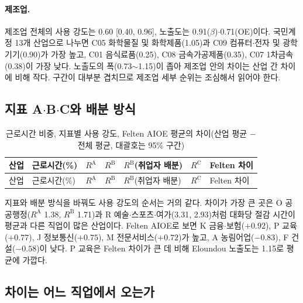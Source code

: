 \documentclass[11pt]{article}
\begin{document}
\paragraph{제조업.} 제조업 전체의 사용 강도는 0.60 [0.40, 0.96], 노출도는 0.91($\beta$)$\cdot$0.71(OE)이다. 국민계정 13개 산업으로 나누면 C05 화학물질 및 화학제품(1.05)과 C09 컴퓨터$\cdot$전자 및 광학기기(0.90)가 가장 높고, C01 음식료품(0.25), C08 금속가공제품(0.35), C07 1차금속(0.38)이 가장 낮다. 노출도의 폭(0.73$\sim$1.15)이 좁아 제조업 안의 차이는 산업 간 차이에 비해 작다. 구간이 대부분 겹치므로 제조업 세부 순위는 조심해서 읽어야 한다.

\subsection{지표 A$\cdot$B$\cdot$C와 배분 방식}

\begin{small}
\begin{longtable}{L{4.6cm}R{1.6cm}R{1.3cm}R{1.3cm}R{2.2cm}R{1.3cm}R{3.2cm}}
\caption{근로시간 비중, 지표별 사용 강도, Felten AIOE 평균의 차이(산업 평균 $-$ 전체 평균, 대괄호는 95\% 구간)}\label{tab:abc}\\
\toprule
산업 & 근로시간(\%) & $R^{\mathrm{A}}$ & $R^{\mathrm{B}}$ & $R^{\mathrm{B}}$(취업자 배분) & $R^{\mathrm{C}}$ & Felten 차이 \\
\midrule
\endfirsthead
\toprule
산업 & 근로시간(\%) & $R^{\mathrm{A}}$ & $R^{\mathrm{B}}$ & $R^{\mathrm{B}}$(취업자 배분) & $R^{\mathrm{C}}$ & Felten 차이 \\
\midrule
\endhead

\bottomrule
\end{longtable}
\end{small}

지표와 배분 방식을 바꿔도 사용 강도의 순서는 거의 같다. 차이가 가장 큰 곳은 O 공공행정($R^{\mathrm{A}}$ 1.38, $R^{\mathrm{B}}$ 1.71)과 R 예술$\cdot$스포츠$\cdot$여가(3.31, 2.93)처럼 대화당 절감 시간이 평균과 다른 직업이 많은 산업이다. Felten AIOE로 보면 K 금융$\cdot$보험($+0.92$), P 교육($+0.77$), J 정보통신($+0.75$), M 전문서비스($+0.72$)가 높고, A 농림어업($-0.83$), F 건설($-0.58$)이 낮다. P 교육은 Felten 차이가 큰 데 비해 Eloundou 노출도는 1.15로 평균에 가깝다.

\subsection{차이는 어느 직업에서 오는가}
\end{document}
